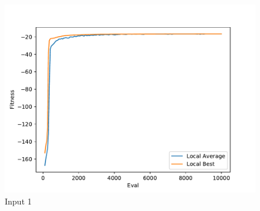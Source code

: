 \documentclass{standalone}
\begin{document}
\begin{figure}[!htb]
	\caption{Input 1}
	\label{fig:graph_1021}
	\includegraphics[width=\textwidth]{../graphs/graphs/1021.pdf}
\end{figure}
\end{document}
